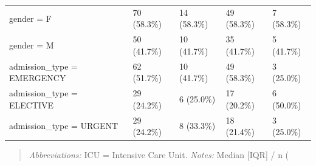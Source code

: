 \begin{table}[htbp]
\begin{tabular}{lllll}
gender = F & 70 (58.3\%) & 14 (58.3\%) & 49 (58.3\%) & 7 (58.3\%) \\
gender = M & 50 (41.7\%) & 10 (41.7\%) & 35 (41.7\%) & 5 (41.7\%) \\
admission\_type = EMERGENCY & 62 (51.7\%) & 10 (41.7\%) & 49 (58.3\%) & 3 (25.0\%) \\
admission\_type = ELECTIVE & 29 (24.2\%) & 6 (25.0\%) & 17 (20.2\%) & 6 (50.0\%) \\
admission\_type = URGENT & 29 (24.2\%) & 8 (33.3\%) & 18 (21.4\%) & 3 (25.0\%) \\
\bottomrule
\end{tabular}

\end{table}


\begin{quote}\small
\textit{Abbreviations:} ICU = Intensive Care Unit.
\textit{Notes:} Median [IQR] / n (%
\end{quote}